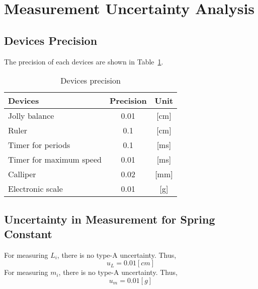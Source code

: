 \section{Measurement Uncertainty Analysis}

\subsection{Devices Precision}
The precision of each devices are shown in Table~\ref{pres}.
\begin{table}
	\centering
	\begin{tabular}{|l|c|c|}
	\hline
	Devices & Precision & Unit 				\\ \hline
	Jolly balance & 0.01 & [cm] 			\\ \hline
	Ruler & 0.1 & [cm]						\\ \hline
	Timer for periods & 0.1 & [ms]			\\ \hline
	Timer for maximum speed & 0.01 & [ms]	\\ \hline
	Calliper & 0.02 & [mm]					\\ \hline
	Electronic scale & 0.01 & [g]			\\ \hline
	\end{tabular}
	\caption{Devices precision}
\label{pres}
\end{table}

\subsection{Uncertainty in Measurement for Spring Constant}
For measuring $L_i$, there is no type-A uncertainty.
Thus, $$ u_L = 0.01 [cm] $$
For measuring $m_i$, there is no type-A uncertainty.
Thus, $$ u_m = 0.01 [g] $$


